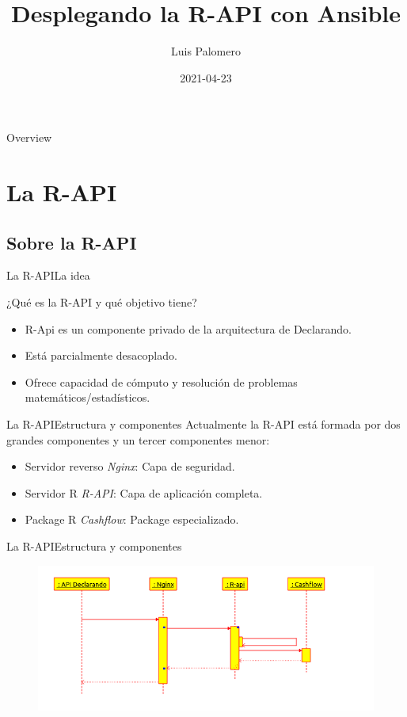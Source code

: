 \documentclass[12pt, aspectratio=169]{beamer} %
\title{Desplegando la R-API con Ansible}
\author{Luis Palomero}
\date{2021-04-23}
\begin{document}
\frame{\titlepage}


\begin{frame}{Overview}
\tableofcontents
\end{frame}

\section{La R-API}
\subsection{Sobre la R-API}
\begin{frame}{La R-API}{La idea}

  \begin{block}{¿Qué es la R-API y qué objetivo tiene?}
    \begin{itemize}
    \item R-Api es un componente privado de la arquitectura de Declarando.
    \item Está parcialmente desacoplado.
    \item Ofrece capacidad de cómputo y resolución de problemas matemáticos/estadísticos.
    \end{itemize}
  \end{block}

\end{frame}

\begin{frame}{La R-API}{Estructura y componentes}
  Actualmente la R-API está formada por dos grandes componentes y un tercer componentes menor:
  \begin{itemize}
  \item Servidor reverso \textit{Nginx}: Capa de seguridad.
  \item Servidor R \textit{R-API}: Capa de aplicación completa.
    \item Package R \textit{Cashflow}: Package especializado.
    
  \end{itemize}
  
\end{frame}



\begin{frame}{La R-API}{Estructura y componentes}
  \begin{figure}
    \includegraphics[width=1\textwidth]{20210407_1_estructura_clases.png}
    \label{fig:estructura_clases}
  \end{figure}

\end{frame}
\end{document}
